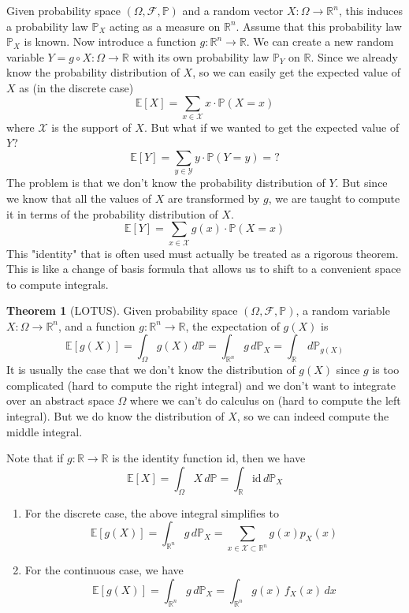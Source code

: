 \documentclass{article}
\theoremstyle{definition}
\newtheorem{theorem}{Theorem}[section]
\theoremstyle{remark}
\theoremstyle{definition}
\begin{document}
Given probability space $(\Omega, \mathcal{F}, \mathbb{P})$ and a random vector $X: \Omega \rightarrow \mathbb{R}^n$, this induces a probability law $\mathbb{P}_X$ acting as a measure on $\mathbb{R}^n$. Assume that this probability law $\mathbb{P}_X$ is known. Now introduce a function $g: \mathbb{R}^n \rightarrow \mathbb{R}$. We can create a new random variable $Y = g \circ X : \Omega \rightarrow \mathbb{R}$ with its own probability law $\mathbb{P}_Y$ on $\mathbb{R}$. Since we already know the probability distribution of $X$, so we can easily get the expected value of $X$ as (in the discrete case) 
\[\mathbb{E}[X] = \sum_{x \in \mathcal{X}} x \cdot \mathbb{P}(X = x)\]
where $\mathcal{X}$ is the support of $X$. But what if we wanted to get the expected value of $Y$? 
\[\mathbb{E}[Y] = \sum_{y \in \mathcal{Y}} y \cdot \mathbb{P}(Y = y) = ?\]
The problem is that we don't know the probability distribution of $Y$. But since we know that all the values of $X$ are transformed by $g$, we are taught to compute it in terms of the probability distribution of $X$. 
\[\mathbb{E}[Y] = \sum_{x \in \mathcal{X}} g(x) \cdot \mathbb{P}(X = x)\]
This "identity" that is often used must actually be treated as a rigorous theorem. This is like a change of basis formula that allows us to shift to a convenient space to compute integrals. 

\begin{theorem}[LOTUS]
Given probability space $(\Omega, \mathcal{F}, \mathbb{P})$, a random variable $X: \Omega \rightarrow \mathbb{R}^n$, and a function $g: \mathbb{R}^n \rightarrow \mathbb{R}$, the expectation of $g(X)$ is 
\[\mathbb{E}[g(X)] = \int_\Omega g(X) \,d\mathbb{P} = \int_{\mathbb{R}^n} g \, d\mathbb{P}_X = \int_\mathbb{R} \,d \mathbb{P}_{g(X)}\]
It is usually the case that we don't know the distribution of $g(X)$ since $g$ is too complicated (hard to compute the right integral) and we don't want to integrate over an abstract space $\Omega$ where we can't do calculus on (hard to compute the left integral). But we do know the distribution of $X$, so we can indeed compute the middle integral. 
\end{theorem}

Note that if $g: \mathbb{R} \rightarrow \mathbb{R}$ is the identity function $\mathrm{id}$, then we have 
\[\mathbb{E}[X] = \int_\Omega X \,d\mathbb{P} = \int_{\mathbb{R}} \mathrm{id} \, d\mathbb{P}_X\]
\begin{enumerate}
    \item For the discrete case, the above integral simplifies to 
    \[\mathbb{E}[g(X)] = \int_{\mathbb{R}^n} g \,d \mathbb{P}_X = \sum_{x \in \mathcal{X} \subset \mathbb{R}^n} g(x) p_X (x)\]
    
    \item For the continuous case, we have 
    \[\mathbb{E}[g(X)] = \int_{\mathbb{R}^n} g \,d \mathbb{P}_X = \int_{\mathbb{R}^n} g (x) \, f_X (x) \,dx \]
\end{enumerate}
\end{document}
